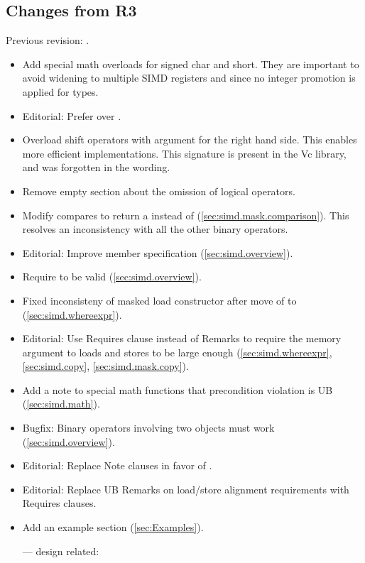 \subsection{Changes from R3}
Previous revision: \parencite{P0214R3}.
\begin{itemize}
  \item Add special math overloads for signed char and short.
        They are important to avoid widening to multiple SIMD registers and since no integer promotion is applied for \simd types.
  \item Editorial: Prefer  over .
  \item Overload shift operators with \intt argument for the right hand side.
        This enables more efficient implementations.
        This signature is present in the Vc library, and was forgotten in the wording.
  \item Remove empty section about the omission of logical operators.
  \item Modify \mask compares to return a \mask instead of \bool (\ref{sec:simd.mask.comparison}).
        This resolves an inconsistency with all the other binary operators.
  \item Editorial: Improve  member specification (\ref{sec:simd.overview}).
  \item Require  to be valid (\ref{sec:simd.overview}).
  \item Fixed inconsisteny of masked load constructor after move of  to  (\ref{sec:simd.whereexpr}).
  \item Editorial: Use Requires clause instead of Remarks to require the memory argument to loads and stores to be large enough (\ref{sec:simd.whereexpr}, \ref{sec:simd.copy}, \ref{sec:simd.mask.copy}).
  \item Add a note to special math functions that precondition violation is UB (\ref{sec:simd.math}).
  \item Bugfix: Binary operators involving two  objects must work (\ref{sec:simd.overview}).
  \item Editorial: Replace Note clauses in favor of \wgNote{}.
  \item Editorial: Replace UB Remarks on load/store alignment requirements with Requires clauses.
  \item Add an example section (\ref{sec:Examples}).
  \item[---] design related:

\end{itemize}
